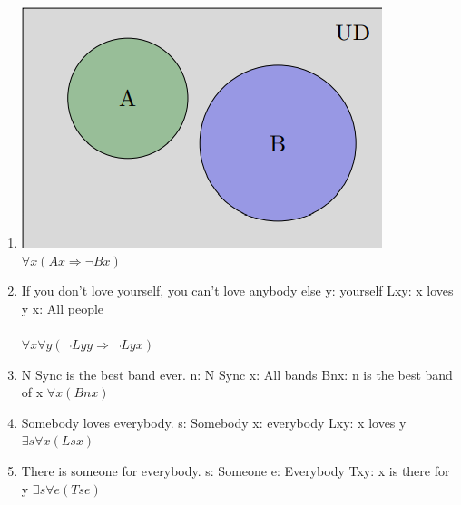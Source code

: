 \documentclass[]{article}
\begin{document}
\begin{enumerate}
    \item \includegraphics[scale=0.5]{Sub2.1Q5.png}
    \newline $\forall x(Ax \Rightarrow \neg Bx)$
    
    \item If you don’t love yourself, you can’t love anybody else
    \newline y: yourself
    \newline Lxy: x loves y
    \newline x: All people
    \\\\ $\forall x \forall y(\neg Lyy \Rightarrow \neg Lyx)$
    
    \item N Sync is the best band ever.
    \newline n: N Sync
    \newline x: All bands
    \newline Bnx: n is the best band of x
    \newline $\forall x (Bnx)$
    
    \item  Somebody loves everybody.
    \newline s: Somebody
    \newline x: everybody
    \newline Lxy: x loves y
    \newline $\exists s \forall x  (Lsx)$
    
    \item There is someone for everybody.
    \newline s: Someone
    \newline e: Everybody
    \newline Txy: x is there for y
    \newline $\exists s \forall e  (Tse)$
    

\end{enumerate}
\end{document}
